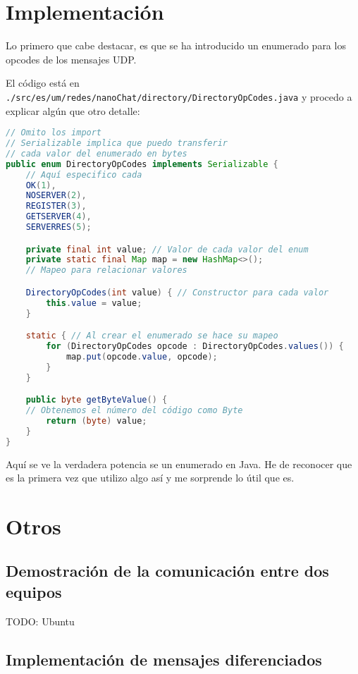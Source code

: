 \documentclass{article}
\begin{document}
\section{Implementación}

Lo primero que cabe destacar, es que se ha introducido un enumerado para los opcodes de los mensajes UDP.

El código está en \texttt{./src/es/um/redes/nanoChat/directory/DirectoryOpCodes.java} y procedo a explicar algún que otro detalle:

\begin{lstlisting}[language=Java, caption=Parte del código]
// Omito los import
// Serializable implica que puedo transferir
// cada valor del enumerado en bytes
public enum DirectoryOpCodes implements Serializable {
    // Aquí especifico cada 
    OK(1),
    NOSERVER(2),
    REGISTER(3),
    GETSERVER(4),
    SERVERRES(5);

    private final int value; // Valor de cada valor del enum
    private static final Map map = new HashMap<>(); 
    // Mapeo para relacionar valores

    DirectoryOpCodes(int value) { // Constructor para cada valor
        this.value = value;
    }

    static { // Al crear el enumerado se hace su mapeo
        for (DirectoryOpCodes opcode : DirectoryOpCodes.values()) {
            map.put(opcode.value, opcode);
        }
    }

    public byte getByteValue() {
    // Obtenemos el número del código como Byte
        return (byte) value;
    }
}
\end{lstlisting}

Aquí se ve la verdadera potencia se un enumerado en Java. He de reconocer que es la primera vez que utilizo algo así y me sorprende lo útil que es.

\section{Otros}


\subsection{Demostración de la comunicación entre dos equipos}

TODO: Ubuntu

\subsection{Implementación de mensajes diferenciados}
\end{document}

